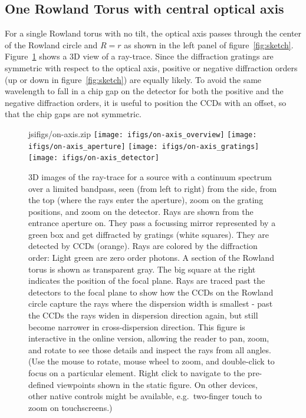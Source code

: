\documentclass[linenumbers]{aastex631}
\begin{document}
\subsection{One Rowland Torus with central optical axis}
\label{sect:onetorus}
For a single Rowland torus with no tilt, the optical axis passes through the center of the Rowland circle and $R=r$ as shown in the left panel of figure~\ref{fig:sketch}. Figure~\ref{fig:3d:single} shows a 3D view of a ray-trace. Since the diffraction gratings are symmetric with respect to the optical axis, positive or negative diffraction orders (up or down in figure~\ref{fig:sketch}) are equally likely.
To avoid the same wavelength to fall in a chip gap on the detector for both the positive and the negative diffraction orders, it is useful to position the CCDs with an offset, so that the chip gaps are not symmetric.
\begin{figure}
  \begin{interactive}{js}{ifigs/on-axis.zip}
  \texttt{[image: ifigs/on-axis\_overview]}
  \texttt{[image: ifigs/on-axis\_aperture]}
  \texttt{[image: ifigs/on-axis\_gratings]}
  \texttt{[image: ifigs/on-axis\_detector]}
  \end{interactive}
\caption{3D images of the ray-trace for a source with a continuum spectrum over a limited bandpass, seen (from left to right) from the side, from the top (where the rays enter the aperture), zoom on the grating positions, and zoom on the detector. Rays are shown from the entrance aperture on. They pass a focussing mirror represented by a green box and get diffracted by gratings (white squares). They are detected by CCDs (orange). Rays are colored by the diffraction order: Light green are zero order photons. A section of the Rowland torus is shown as transparent gray. The big square at the right indicates the position of the focal plane. Rays are traced past the detectors to the focal plane to show how the CCDs on the Rowland circle capture the rays where the dispersion width is smallest - past the CCDs the rays widen in dispersion direction again, but still become narrower in cross-dispersion direction. This figure is interactive in the online version, allowing the reader to pan, zoom, and rotate to see those details and inspect the rays from all angles. (Use the mouse to rotate, mouse wheel to zoom, and double-click to focus on a particular element. Right click to navigate to the pre-defined viewpoints shown in the static figure. On other devices, other native controls might be available, e.g.\ two-finger touch to zoom on touchscreens.)
\label{fig:3d:single}}

\end{figure}
\end{document}
